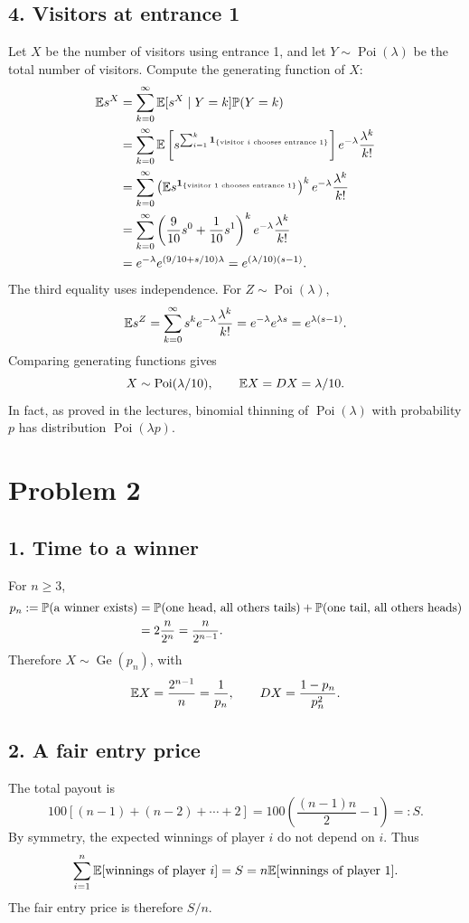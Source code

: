 \documentclass[11pt,a4paper]{article}
\begin{document}
\subsection*{4. Visitors at entrance 1}
Let $X$ be the number of visitors using entrance 1, and let $Y\sim\operatorname{Poi}(\lambda)$ be the total number of visitors. Compute the generating function of $X$:
\begin{align*}
\E s^X&=\sum_{k=0}^\infty\E[s^X\mid Y=k]\P(Y=k)\\
&=\sum_{k=0}^\infty
\E\left[s^{\sum_{i=1}^k\mathbf1_{\{\text{visitor }i\text{ chooses entrance 1}\}}}\right]
e^{-\lambda}\frac{\lambda^k}{k!}\\
&=\sum_{k=0}^\infty
\left(\E s^{\mathbf1_{\{\text{visitor 1 chooses entrance 1}\}}}\right)^k
e^{-\lambda}\frac{\lambda^k}{k!}\\
&=\sum_{k=0}^\infty\left(\frac9{10}s^0+\frac1{10}s^1\right)^k
e^{-\lambda}\frac{\lambda^k}{k!}\\
&=e^{-\lambda}e^{(9/10+s/10)\lambda}
=e^{(\lambda/10)(s-1)}.
\end{align*}
The third equality uses independence. For $Z\sim\operatorname{Poi}(\lambda)$,
\[
\E s^Z=\sum_{k=0}^\infty s^k e^{-\lambda}\frac{\lambda^k}{k!}
=e^{-\lambda}e^{\lambda s}=e^{\lambda(s-1)}.
\]
Comparing generating functions gives
\[
X\sim\operatorname{Poi}(\lambda/10),\qquad\E X=DX=\lambda/10.
\]
In fact, as proved in the lectures, binomial thinning of $\operatorname{Poi}(\lambda)$ with probability $p$ has distribution $\operatorname{Poi}(\lambda p)$.

\section*{Problem 2}
\subsection*{1. Time to a winner}
For $n\ge3$,
\begin{align*}
p_n:=\P(\text{a winner exists})
&=\P(\text{one head, all others tails})
+\P(\text{one tail, all others heads})\\
&=2\frac n{2^n}=\frac n{2^{n-1}}.
\end{align*}
Therefore $X\sim\operatorname{Ge}(p_n)$, with
\[
\E X=\frac{2^{n-1}}n=\frac1{p_n},\qquad DX=\frac{1-p_n}{p_n^2}.
\]
\subsection*{2. A fair entry price}
The total payout is
\[
100[(n-1)+(n-2)+\cdots+2]
=100\left(\frac{(n-1)n}2-1\right)=:S.
\]
By symmetry, the expected winnings of player $i$ do not depend on $i$. Thus
\[
\sum_{i=1}^n\E[\text{winnings of player }i]
=S=n\E[\text{winnings of player 1}].
\]
The fair entry price is therefore $S/n$.
\end{document}
